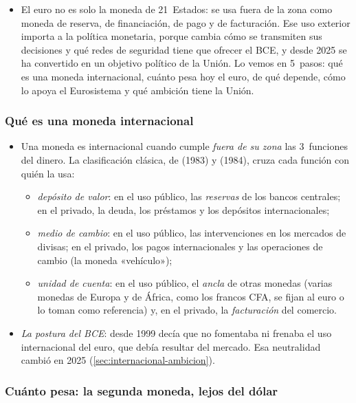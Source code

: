 \documentclass[11pt]{article}
\begin{document}
\begin{itemize}
\item El euro no es solo la moneda de 21~Estados: se usa fuera de la zona como moneda de reserva, de financiación, de pago y de facturación. Ese uso exterior importa a la política monetaria, porque cambia cómo se transmiten sus decisiones y qué redes de seguridad tiene que ofrecer el BCE, y desde 2025 se ha convertido en un objetivo político de la Unión. Lo vemos en 5~pasos: qué es una moneda internacional, cuánto pesa hoy el euro, de qué depende, cómo lo apoya el Eurosistema y qué ambición tiene la Unión.
\end{itemize}

\subsubsection{Qué es una moneda internacional}\label{sec:internacional-concepto}

\begin{itemize}
\item Una moneda es internacional cuando cumple \emph{fuera de su zona} las 3~funciones del dinero. La clasificación clásica, de  (1983) y  (1984), cruza cada función con quién la usa\nocite{Kenen1983Role,Krugman1984International}:
  \begin{itemize}
  \item \emph{depósito de valor}: en el uso público, las \emph{reservas} de los bancos centrales; en el privado, la deuda, los préstamos y los depósitos internacionales;
  \item \emph{medio de cambio}: en el uso público, las intervenciones en los mercados de divisas; en el privado, los pagos internacionales y las operaciones de cambio (la moneda «vehículo»);
  \item \emph{unidad de cuenta}: en el uso público, el \emph{ancla} de otras monedas (varias monedas de Europa y de África, como los francos CFA, se fijan al euro o lo toman como referencia) y, en el privado, la \emph{facturación} del comercio.
  \end{itemize}
\item \emph{La postura del BCE}: desde 1999 decía que no fomentaba ni frenaba el uso internacional del euro, que debía resultar del mercado. Esa neutralidad cambió en 2025 (\ref{sec:internacional-ambicion}).
\end{itemize}

\subsubsection{Cuánto pesa: la segunda moneda, lejos del dólar}\label{sec:internacional-datos}
\end{document}
